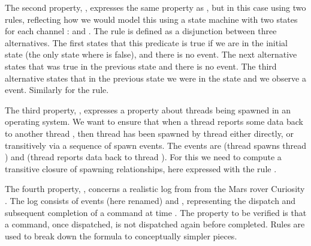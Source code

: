 The second property, , expresses the same 
property as , but in this case using two 
rules, reflecting how we would model this using a state machine with two states for each channel : 
 and . The rule  is defined as a disjunction between three alternatives. The first states that this predicate is true if we are in the initial state 
(the only state where  is false), and there is no  event. The next alternative states that
 was true in the previous state and there is
no  event.
The third alternative states that in the previous state we were
in the  state and we observe a  
event. Similarly for the  rule.
 
The third property, , expresses a property
about threads being spawned in an operating system. We want to 
ensure that when a thread  reports some data  
back to another thread , then thread  has been spawned by thread  either directly, or transitively 
via a sequence of spawn events. The events are
 (thread  spawns thread )
and  (thread  reports data 
back to thread ).
For this we need to compute a transitive closure of spawning relationships, here expressed with the rule .

The fourth property, , 
concerns a realistic log from from the Mars rover Curiosity 
\cite{msl}. The log consists of events 
(here renamed)  and , 
representing the dispatch and subsequent completion  of a command 
 at time . The property to be verified is that a command, once 
dispatched, is not dispatched again before completed. Rules 
are used to break down the formula to conceptually simpler pieces. 

%
%

\iffalse
